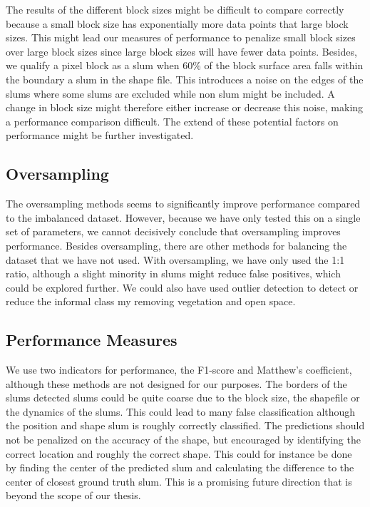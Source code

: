 The results of the different block sizes might be difficult to compare correctly because a small block size has exponentially more data points that large block sizes. This might lead our measures of performance to penalize small block sizes over large block sizes since large block sizes will have fewer data points. Besides, we qualify a pixel block as a slum when 60\% of the block surface area falls within the boundary a slum in the shape file. This introduces a noise on the edges of the slums where some slums are excluded while non slum might be included. A change in block size might therefore either increase or decrease this noise, making a performance comparison difficult. The extend of these potential factors on performance might be further investigated.

\subsection{Oversampling}
The oversampling methods seems to significantly improve performance compared to the imbalanced dataset. However, because we have only tested this on a single set of parameters, we cannot decisively conclude that oversampling improves performance. Besides oversampling, there are other methods for balancing the dataset that we have not used. With oversampling, we have only used the 1:1 ratio, although a slight minority in slums might reduce false positives, which could be explored further. We could also have used outlier detection to detect or reduce the informal class my removing vegetation and open space. 

\subsection{Performance Measures}
We use two indicators for performance, the F1-score and Matthew's coefficient, although these methods are not designed for our purposes. The borders of the slums detected slums could be quite coarse due to the block size, the shapefile or the dynamics of the slums. This could lead to many false classification although the position and shape slum is roughly correctly classified. The predictions should not be penalized on the accuracy of the shape, but encouraged by identifying the correct location and roughly the correct shape. This could for instance be done by finding the center of the predicted slum and calculating the difference to the center of closest ground truth slum. This is a promising future direction that is beyond the scope of our thesis.

